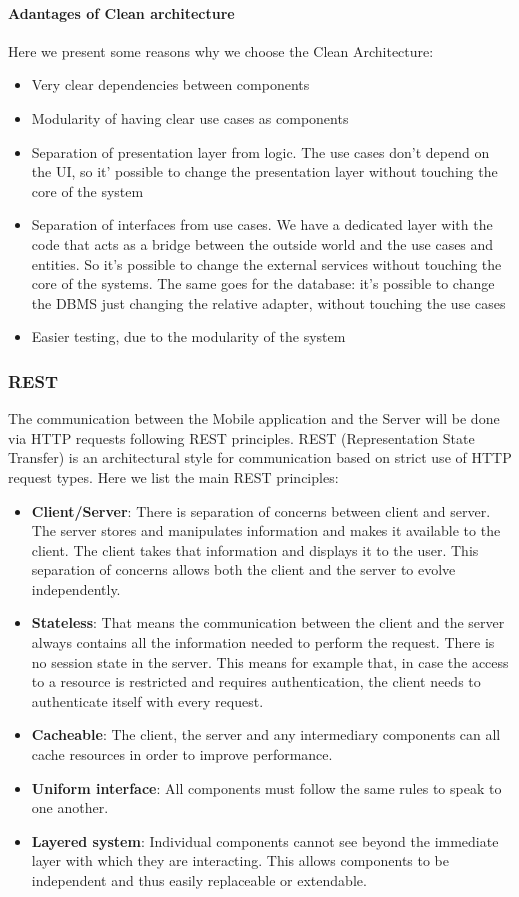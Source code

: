 \paragraph{Adantages of Clean architecture}
Here we present some reasons why we choose the Clean Architecture:
\begin{itemize}
  \item Very clear dependencies between components
  \item Modularity of having clear use cases as components
  \item Separation of presentation layer from logic. The use cases don't depend on the UI, so it' possible to change the presentation layer without touching the core of the system
  \item Separation of interfaces from use cases. We have a dedicated layer with the code that acts as a bridge between the outside world and the use cases and entities. So it's possible to change the external services without touching the core of the systems. The same goes for the database: it's possible to change the DBMS just changing the relative adapter, without touching the use cases
  \item Easier testing, due to the modularity of the system
\end{itemize}

\subsubsection{REST}
The communication between the Mobile application and the Server will be done via HTTP requests following REST principles. REST (Representation State Transfer) is an architectural style for communication based on strict use of HTTP request types.
Here we list the main REST principles:
\begin{itemize}
  \item \textbf{Client/Server}: There is separation of concerns between client and server. The server stores and manipulates information and makes it available to the client. The client takes that information and displays it to the user. This separation of concerns allows both the client and the server to evolve independently.
  \item \textbf{Stateless}: That means the communication between the client and the server always contains all the information needed to perform the request. There is no session state in the server. This means for example that, in case the access to a resource is restricted and requires authentication, the client needs to authenticate itself with every request.
  \item \textbf{Cacheable}:  The client, the server and any intermediary components can all cache resources in order to improve performance.
  \item \textbf{Uniform interface}: All components must follow the same rules to speak to one another.
  \item \textbf{Layered system}: Individual components cannot see beyond the immediate layer with which they are interacting. This allows components to be independent and thus easily replaceable or extendable.
\end{itemize}

